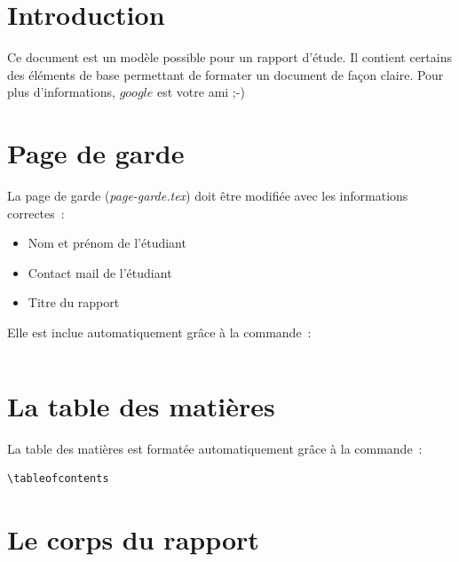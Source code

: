 \documentclass[twoside,openright,a4paper,11pt,french]{article}
\begin{document}
\pagestyle{plain}



\cleardoublepage

\parskip=0pt
\tableofcontents

\cleardoublepage

\section{Introduction}
\label{sec:intro}
Ce document est un modèle possible pour un rapport d'étude.
Il contient certains des éléments de base permettant de formater un document de façon claire.
Pour plus d'informations, $google$ est votre ami ;-)

\section{Page de garde}

La page de garde ({\it page-garde.tex}) doit être modifiée avec les informations correctes~:
\begin{itemize}
\item Nom et prénom de l'étudiant
\item Contact mail de l'étudiant
\item Titre du rapport
\end{itemize}

Elle est inclue automatiquement grâce à la commande~:
\begin{verbatim}

\end{verbatim}


\section{La table des matières}

La table des matières est formatée automatiquement grâce à la commande~:
\begin{verbatim}
\tableofcontents
\end{verbatim}


\section{Le corps du rapport}
\end{document}
